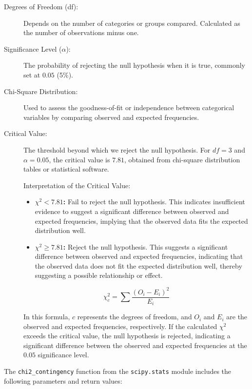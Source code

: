 \begin{description}
    \item[Degrees of Freedom (df):] Depends on the number of categories or groups compared. Calculated as the number of observations minus one.
    \item[Significance Level ($\alpha$):] The probability of rejecting the null hypothesis when it is true, commonly set at $0.05$ (5\%).
    \item[Chi-Square Distribution:] Used to assess the goodness-of-fit or independence between categorical variables by comparing observed and expected frequencies.
    \item[Critical Value:] The threshold beyond which we reject the null hypothesis. For $df = 3$ and $\alpha = 0.05$, the critical value is $7.81$, obtained from chi-square distribution tables or statistical software.
    \item[\hspace{=2em}]Interpretation of the Critical Value:
    \begin{itemize}
    \item \textbf{$\chi^2 < 7.81$:} Fail to reject the null hypothesis. This indicates insufficient evidence to suggest a significant difference between observed and expected frequencies, implying that the observed data fits the expected distribution well.
    \item \textbf{$\chi^2 \ge 7.81$:} Reject the null hypothesis. This suggests a significant difference between observed and expected frequencies, indicating that the observed data does not fit the expected distribution well, thereby suggesting a possible relationship or effect.
\end{itemize}

\begin{equation} \label{chi-test}
    \chi^2_c = \sum \frac{(O_i - E_i)^2}{E_i}
\end{equation}

\hspace{=2em}In this formula, $c$ represents the degrees of freedom, and $O_i$ and $E_i$ are the observed and expected frequencies, respectively. If the calculated $\chi^2$ exceeds the critical value, the null hypothesis is rejected, indicating a significant difference between the observed and expected frequencies at the $0.05$ significance level.
\end{description}





The \texttt{chi2\_contingency} function from the \texttt{scipy.stats} module includes the following parameters and return values:

